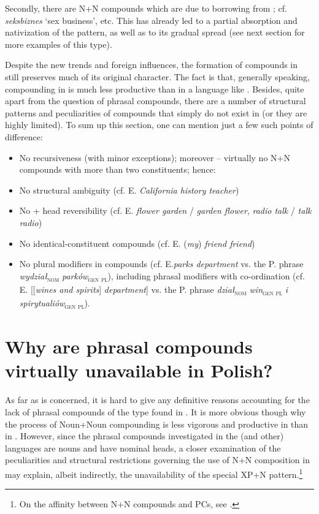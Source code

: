 \documentclass[output=paper]{LSP/langsci}
\begin{document}
{Secondly, there are N+N compounds which are due to borrowing from ; cf.} {\textit{seksbiznes}} {‘sex business’, etc. This has already led to a partial absorption and nativization of the  pattern, as well as to its gradual spread (see next section for more examples of this type).}



Despite the new trends and foreign influences, the formation of compounds in  still preserves much of its original character. The fact is that, generally speaking, compounding in  is much less productive than in a language like . Besides, quite apart from the question of phrasal compounds, there are a number of structural patterns and peculiarities of  compounds that simply do not exist in  (or they are highly limited). To sum up this section, one can mention just a few such points of difference:

\begin{itemize}
\item No recursiveness (with minor exceptions); moreover – virtually no N+N compounds with more than two constituents; hence:
\item No structural ambiguity (cf. E. \textit{California history teacher})
\item No  + head reversibility (cf. E. \textit{flower garden} {/} \textit{garden flower}, \textit{radio talk} {/} \textit{talk radio})
\item  No identical-constituent compounds (cf. E. (\textit{my}) \textit{friend friend})
\item No plural modifiers in compounds (cf. E.\textit{parks department} vs. the P. phrase \textit{wydział}\textsc{\textsubscript{nom}} \textit{parków}{\textsc{\textsubscript{gen pl}}}), including phrasal modifiers with co-ordination (cf. E. [[\textit{wines and spirits}] \textit{department}] vs. the P. phrase {\textit{dział}}{\textsc{\textsubscript{nom}}} {\textit{win}}{\textsc{\textsubscript{gen pl}}} {\textit{i spirytualiów}}{\textsc{\textsubscript{gen pl}}}).
\end{itemize}

\section{Why are phrasal compounds virtually unavailable in Polish?}\label{sec:szymanek:3}

As far as  is concerned, it is hard to give any definitive reasons accounting for the lack of phrasal compounds of the type found in . It is more obvious though why the process of Noun+Noun compounding is less vigorous and productive in  than in . However, since the phrasal compounds investigated in the  (and other) languages are nouns and have nominal heads, a closer examination of the peculiarities and structural restrictions governing the use of N+N composition in  may explain, albeit indirectly, the unavailability of the special XP+N pattern.\footnote{{On the affinity between N+N compounds and PCs, see \citet{Pafel2015}.}}
\end{document}

